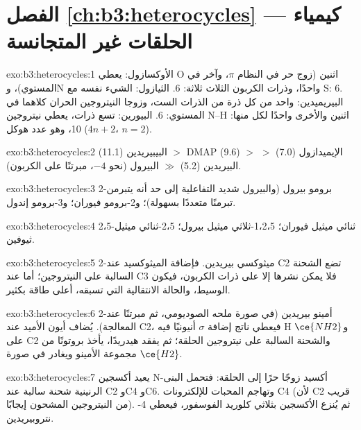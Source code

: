 \section*{الفصل \ref{ch:b3:heterocycles} --- كيمياء الحلقات غير المتجانسة}

\begin{solution}{exo:b3:heterocycles:1}
الأوكسازول: يعطي O اثنين (زوج حر في النظام $\pi$، وآخر في المستوي)، وN واحدًا، 
وذرات الكربون الثلاث ثلاثة: 6. الثيازول: الشيء نفسه مع S: 6. البيريميدين: واحد من كل
ذرة من الذرات الست، وزوجا النيتروجين الحران كلاهما في المستوي: 6. البيورين: تسع ذرات،
يعطي نيتروجين N--H اثنين والأخرى واحدًا لكل منها: 10، وهو عدد هوكل
($4n + 2$، $n = 2$).
\end{solution}

\begin{solution}{exo:b3:heterocycles:2}
البيبيريدين (11.1) $>$ DMAP (9.6) $>$ الإيميدازول (7.0) $>$ البيريدين (5.2) $\gg$ البيرول (نحو $-4$،
مبرتنًا على الكربون).
\end{solution}

\begin{solution}{exo:b3:heterocycles:3}
2-برومو بيرول (والبيرول شديد التفاعلية إلى حد أنه يتبرمن تبرمنًا متعددًا بسهولة)؛
و2-برومو فيوران؛ و3-برومو إندول.
\end{solution}

\begin{solution}{exo:b3:heterocycles:4}
2،5-ثنائي ميثيل فيوران؛ 1،2،5-ثلاثي ميثيل بيرول؛ 2،5-ثنائي ميثيل ثيوفين.
\end{solution}

\begin{solution}{exo:b3:heterocycles:5}
2-ميثوكسي بيريدين. فإضافة الميثوكسيد عند C2 تضع الشحنة السالبة  على النيتروجين؛ أما عند C3 فلا يمكن نشرها إلا على ذرات الكربون، فيكون
الوسيط، والحالة الانتقالية التي تسبقه، أعلى طاقة بكثير.
\end{solution}

\begin{solution}{exo:b3:heterocycles:6}
2-أمينو بيريدين (في صورة ملحه الصوديومي، ثم مبرتنًا عند المعالجة). يُضاف أيون الأميد
عند C2، فيعطي ناتج إضافة $\sigma$ أنيونيًا فيه H و$\ce{NH2}$ على C2 والشحنة
السالبة على نيتروجين الحلقة؛ ثم يفقد هيدريدًا، يأخذ بروتونًا من
مجموعة الأمينو ويغادر في صورة $\ce{H2}$.
\end{solution}

\begin{solution}{exo:b3:heterocycles:7}
يعيد أكسجين N-أكسيد زوجًا حرًا إلى الحلقة: فتحمل البنى الرنينية
شحنة سالبة عند C2 وC4 وC6. وتهاجم المحبات للإلكترونات C4 (لأن C2
قريب من النيتروجين المشحون إيجابًا). ثم يُنزع الأكسجين بثلاثي
كلوريد الفوسفور، فيعطي 4-نتروبيريدين.
\end{solution}

